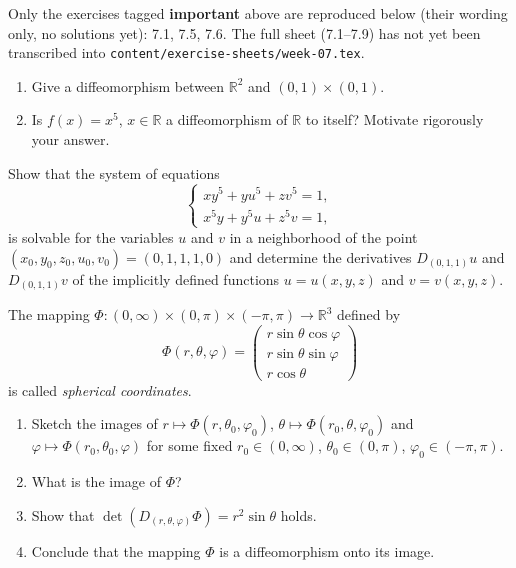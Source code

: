 \begin{ainote}
Only the exercises tagged \textbf{important} above are reproduced below (their wording only, no
solutions yet): 7.1, 7.5, 7.6. The full sheet (7.1--7.9) has not yet been transcribed into
\texttt{content/exercise-sheets/week-07.tex}.
\end{ainote}

\begin{exercise}
\label{ex:7.1}
\begin{enumerate}[label=\textbf{(\alph*)}]
  \item Give a diffeomorphism between $\mathbb{R}^2$ and $(0,1)\times(0,1)$.
  \item Is $f(x) = x^5$, $x \in \mathbb{R}$ a diffeomorphism of $\mathbb{R}$ to itself? Motivate
    rigorously your answer.
\end{enumerate}
\end{exercise}

\begin{exercise}
\label{ex:7.5}
Show that the system of equations
\[\begin{cases} xy^5+yu^5+zv^5=1, \\ x^5y+y^5u+z^5v=1, \end{cases}\]
is solvable for the variables $u$ and $v$ in a neighborhood of the point
$(x_0,y_0,z_0,u_0,v_0) = (0,1,1,1,0)$ and determine the derivatives $D_{(0,1,1)}u$ and
$D_{(0,1,1)}v$ of the implicitly defined functions $u=u(x,y,z)$ and $v=v(x,y,z)$.
\end{exercise}

\begin{exercise}
\label{ex:7.6}
The mapping $\Phi : (0,\infty)\times(0,\pi)\times(-\pi,\pi) \to \mathbb{R}^3$ defined by
\[\Phi(r,\theta,\varphi) = \begin{pmatrix} r\sin\theta\cos\varphi \\ r\sin\theta\sin\varphi \\ r\cos\theta \end{pmatrix}\]
is called \textit{spherical coordinates}.
\begin{enumerate}[label=\textbf{\arabic*.}]
  \item Sketch the images of $r \mapsto \Phi(r,\theta_0,\varphi_0)$, $\theta \mapsto
    \Phi(r_0,\theta,\varphi_0)$ and $\varphi \mapsto \Phi(r_0,\theta_0,\varphi)$ for some fixed
    $r_0 \in (0,\infty)$, $\theta_0 \in (0,\pi)$, $\varphi_0 \in (-\pi,\pi)$.
  \item What is the image of $\Phi$?
  \item Show that $\det(D_{(r,\theta,\varphi)}\Phi) = r^2\sin\theta$ holds.
  \item Conclude that the mapping $\Phi$ is a diffeomorphism onto its image.
\end{enumerate}
\end{exercise}

